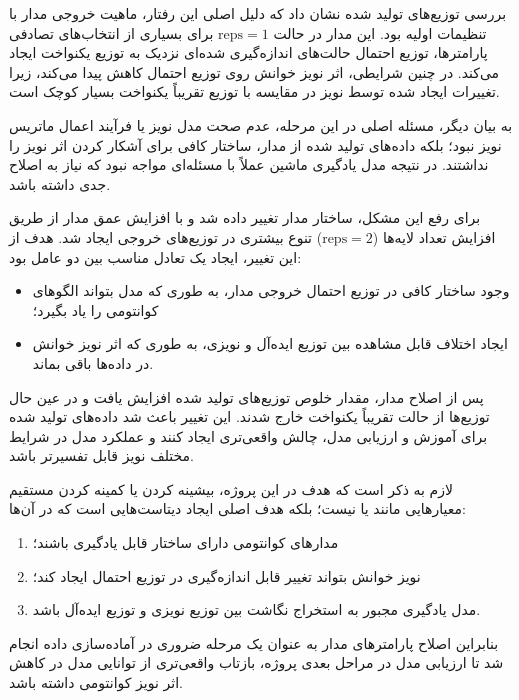 بررسی توزیع‌های تولید شده نشان داد که دلیل اصلی این رفتار، ماهیت خروجی مدار
با تنظیمات اولیه بود. این مدار در حالت
$\mathrm{reps}=1$
برای بسیاری از انتخاب‌های تصادفی پارامترها، توزیع احتمال حالت‌های اندازه‌گیری شده‌ای نزدیک به توزیع یکنواخت ایجاد می‌کند. در چنین شرایطی، اثر نویز خوانش روی توزیع احتمال کاهش پیدا می‌کند، زیرا تغییرات ایجاد شده توسط نویز در مقایسه با توزیع تقریباً یکنواخت بسیار کوچک است.

به بیان دیگر، مسئله اصلی در این مرحله، عدم صحت مدل نویز یا فرآیند اعمال ماتریس نویز نبود؛ بلکه داده‌های تولید شده از مدار، ساختار کافی برای آشکار کردن اثر نویز را نداشتند. در نتیجه مدل یادگیری ماشین عملاً با مسئله‌ای مواجه نبود که نیاز به اصلاح جدی داشته باشد.

برای رفع این مشکل، ساختار مدار تغییر داده شد و با افزایش عمق مدار از طریق افزایش تعداد لایه‌ها
($\mathrm{reps}=2$)
تنوع بیشتری در توزیع‌های خروجی ایجاد شد. هدف از این تغییر، ایجاد یک تعادل مناسب بین دو عامل بود:

\begin{itemize}
	\item وجود ساختار کافی در توزیع احتمال خروجی مدار، به طوری که مدل بتواند الگوهای کوانتومی را یاد بگیرد؛
	\item ایجاد اختلاف قابل مشاهده بین توزیع ایده‌آل و نویزی، به طوری که اثر نویز خوانش در داده‌ها باقی بماند.
\end{itemize}

پس از اصلاح مدار، مقدار خلوص توزیع‌های تولید شده افزایش یافت و در عین حال توزیع‌ها از حالت تقریباً یکنواخت خارج شدند. این تغییر باعث شد داده‌های تولید شده برای آموزش و ارزیابی مدل، چالش واقعی‌تری ایجاد کنند و عملکرد مدل در شرایط مختلف نویز قابل تفسیرتر باشد.

لازم به ذکر است که هدف در این پروژه، بیشینه کردن یا کمینه کردن مستقیم معیارهایی مانند
یا
نیست؛ بلکه هدف اصلی ایجاد دیتاست‌هایی است که در آن‌ها:
\begin{enumerate}
	\item مدارهای کوانتومی دارای ساختار قابل یادگیری باشند؛
	\item نویز خوانش بتواند تغییر قابل اندازه‌گیری در توزیع احتمال ایجاد کند؛
	\item مدل یادگیری مجبور به استخراج نگاشت بین توزیع نویزی و توزیع ایده‌آل باشد.
\end{enumerate}

بنابراین اصلاح پارامترهای مدار
به عنوان یک مرحله ضروری در آماده‌سازی داده انجام شد تا ارزیابی مدل در مراحل بعدی پروژه، بازتاب واقعی‌تری از توانایی مدل در کاهش اثر نویز کوانتومی داشته باشد.


